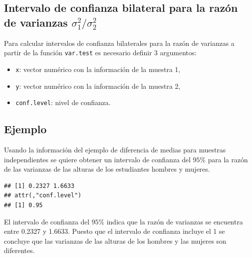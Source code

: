\documentclass[10pt,]{krantz}
\makeatletter
\newenvironment{Shaded}{\begin{snugshade}}{\end{snugshade}}
\newcommand{\KeywordTok}[1]{\textcolor[rgb]{0.13,0.29,0.53}{\textbf{{#1}}}}
\newcommand{\DataTypeTok}[1]{\textcolor[rgb]{0.13,0.29,0.53}{{#1}}}
\newcommand{\FloatTok}[1]{\textcolor[rgb]{0.00,0.00,0.81}{{#1}}}
\newcommand{\NormalTok}[1]{{#1}}
\providecommand{\tightlist}{%
  \setlength{\itemsep}{0pt}\setlength{\parskip}{0pt}}
\newenvironment{kframe}{%
\medskip{}
\setlength{\fboxsep}{.8em}
 \def\at@end@of@kframe{}%
 \ifinner\ifhmode%
  \def\at@end@of@kframe{\end{minipage}}%
  \begin{minipage}{\columnwidth}%
 \fi\fi%
 \def\FrameCommand##1{\hskip\@totalleftmargin \hskip-\fboxsep
 \colorbox{shadecolor}{##1}\hskip-\fboxsep
     \hskip-\linewidth \hskip-\@totalleftmargin \hskip\columnwidth}%
 \MakeFramed {\advance\hsize-\width
   \@totalleftmargin\z@ \linewidth\hsize
   \@setminipage}}%
 {\par\unskip\endMakeFramed%
 \at@end@of@kframe}
\renewenvironment{Shaded}{\begin{kframe}}{\end{kframe}}
\makeatother
\begin{document}
\subsection{\texorpdfstring{Intervalo de confianza bilateral para la
razón de varianzas
\(\sigma_1^2 / \sigma_2^2\)}{Intervalo de confianza bilateral para la razón de varianzas \textbackslash{}sigma\_1\^{}2 / \textbackslash{}sigma\_2\^{}2}}\label{intervalo-de-confianza-bilateral-para-la-razon-de-varianzas-sigma_12-sigma_22}

Para calcular intervalos de confianza bilaterales para la razón de
varianzas a partir de la función \texttt{var.test} es necesario definir
3 argumentos:

\begin{itemize}
\tightlist
\item
  \texttt{x}: vector numérico con la información de la muestra 1,
\item
  \texttt{y}: vector numérico con la información de la muestra 2,
\item
  \texttt{conf.level}: nivel de confianza.
\end{itemize}

\subsection*{Ejemplo}\label{ejemplo-58}


Usando la información del ejemplo de diferencia de medias para muestras
independientes se quiere obtener un intervalo de confianza del \(95\%\)
para la razón de las varianzas de las alturas de los estudiantes hombres
y mujeres.

\begin{Shaded}
\end{Shaded}

\begin{verbatim}
## [1] 0.2327 1.6633
## attr(,"conf.level")
## [1] 0.95
\end{verbatim}

El intervalo de confianza del \(95\%\) indica que la razón de varianzas
se encuentra entre 0.2327 y 1.6633. Puesto que el intervalo de confianza
incluye el 1 se concluye que las varianzas de las alturas de los hombres
y las mujeres son diferentes.
\end{document}
